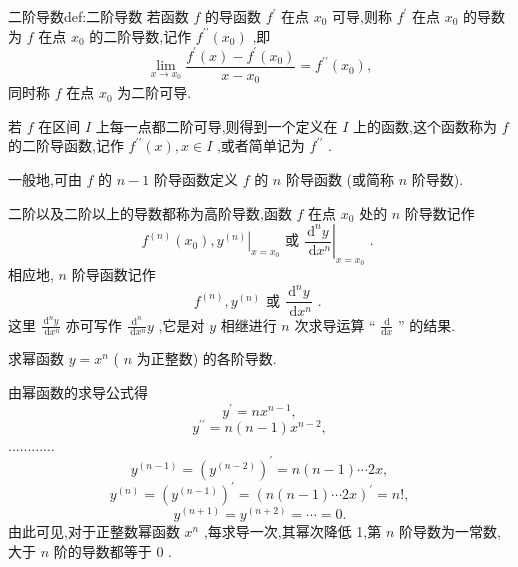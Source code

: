 \begin{definition}{二阶导数}{def:二阶导数}
若函数 \(f\) 的导函数 \({f}^{\prime }\) 在点 \({x}_{0}\) 可导,则称 \({f}^{\prime }\) 在点 \({x}_{0}\) 的导数为 \(f\) 在点 \({x}_{0}\) 的二阶导数,记作 \({f}^{\prime \prime }\left( {x}_{0}\right)\) ,即
\[
\mathop{\lim }\limits_{{x \rightarrow  {x}_{0}}}\frac{{f}^{\prime }\left( x\right)  - {f}^{\prime }\left( {x}_{0}\right) }{x - {x}_{0}} = {f}^{\prime \prime }\left( {x}_{0}\right) ,
\]
同时称 \(f\) 在点 \({x}_{0}\) 为二阶可导.
\end{definition}


若 \(f\) 在区间 \(I\) 上每一点都二阶可导,则得到一个定义在 \(I\) 上的函数,这个函数称为 \(f\) 的二阶导函数,记作 \({f}^{\prime \prime }\left( x\right) ,x \in  I\) ,或者简单记为 \({f}^{\prime \prime }\) .

一般地,可由 \(f\) 的 \(n - 1\) 阶导函数定义 \(f\) 的 \(n\) 阶导函数 (或简称 \(n\) 阶导数).

二阶以及二阶以上的导数都称为高阶导数,函数 \(f\) 在点 \({x}_{0}\) 处的 \(n\) 阶导数记作
\[
{f}^{\left( n\right) }\left( {x}_{0}\right) ,{\left. {y}^{\left( n\right) }\right| }_{x = {x}_{0}}\text{ 或 }{\left. \frac{{\mathrm{d}}^{n}y}{\mathrm{\;d}{x}^{n}}\right| }_{x = {x}_{0}}\text{ . }
\]
相应地, \(n\) 阶导函数记作
\[
{f}^{\left( n\right) },{y}^{\left( n\right) }\text{ 或 }\frac{{\mathrm{d}}^{n}y}{\mathrm{\;d}{x}^{n}}\text{ . }
\]
这里 \(\frac{{\mathrm{d}}^{n}y}{\mathrm{\;d}{x}^{n}}\) 亦可写作 \(\frac{{\mathrm{d}}^{n}}{\mathrm{\;d}{x}^{n}}y\) ,它是对 \(y\) 相继进行 \(n\) 次求导运算 “ \(\frac{\mathrm{d}}{\mathrm{d}x}\) ” 的结果.

\begin{example}
求幂函数 \(y = {x}^{n}\) ( \(n\) 为正整数) 的各阶导数.
\end{example}


\begin{solution}
由幂函数的求导公式得
\[
{y}^{\prime } = n{x}^{n - 1},
\]
\[
{y}^{\prime \prime } = n\left( {n - 1}\right) {x}^{n - 2},
\]
............
\[
{y}^{\left( n - 1\right) } = {\left( {y}^{\left( n - 2\right) }\right) }^{\prime } = n\left( {n - 1}\right) \cdots {2x},
\]
\[
{y}^{\left( n\right) } = {\left( {y}^{\left( n - 1\right) }\right) }^{\prime } = {\left( n\left( n - 1\right) \cdots 2x\right) }^{\prime } = n!,
\]
\[
{y}^{\left( n + 1\right) } = {y}^{\left( n + 2\right) } = \cdots  = 0.
\]
由此可见,对于正整数幂函数 \({x}^{n}\) ,每求导一次,其幂次降低 1,第 \(n\) 阶导数为一常数,大于 \(n\) 阶的导数都等于 0 .
\end{solution}


